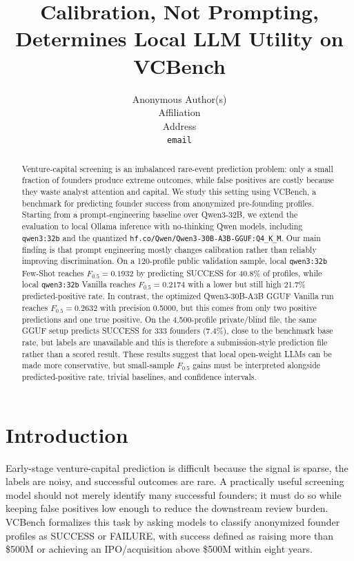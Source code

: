 \documentclass{article}
\title{Calibration, Not Prompting, Determines Local LLM Utility on VCBench}
\author{%
  Anonymous Author(s)\\
  Affiliation\\
  Address\\
  \texttt{email}\\
}
\begin{document}
\maketitle

\begin{abstract}
Venture-capital screening is an imbalanced rare-event prediction problem: only a
small fraction of founders produce extreme outcomes, while false positives are
costly because they waste analyst attention and capital. We study this setting
using VCBench, a benchmark for predicting founder success from anonymized
pre-founding profiles. Starting from a prompt-engineering baseline over
Qwen3-32B, we extend the evaluation to local Ollama inference with no-thinking
Qwen models, including \texttt{qwen3:32b} and the quantized
\texttt{hf.co/Qwen/Qwen3-30B-A3B-GGUF:Q4\_K\_M}. Our main finding is that prompt
engineering mostly changes calibration rather than reliably improving
discrimination. On a 120-profile public validation sample, local
\texttt{qwen3:32b} Few-Shot reaches $F_{0.5}=0.1932$ by predicting SUCCESS for
40.8\% of profiles, while local \texttt{qwen3:32b} Vanilla reaches
$F_{0.5}=0.2174$ with a lower but still high 21.7\% predicted-positive rate. In
contrast, the optimized Qwen3-30B-A3B GGUF Vanilla run reaches
$F_{0.5}=0.2632$ with precision 0.5000, but this comes from only two positive
predictions and one true positive. On the 4,500-profile private/blind file, the
same GGUF setup predicts SUCCESS for 333 founders (7.4\%), close to the
benchmark base rate, but labels are unavailable and this is therefore a
submission-style prediction file rather than a scored result. These results
suggest that local open-weight LLMs can be made more conservative, but
small-sample $F_{0.5}$ gains must be interpreted alongside predicted-positive
rate, trivial baselines, and confidence intervals.
\end{abstract}

\section{Introduction}

Early-stage venture-capital prediction is difficult because the signal is
sparse, the labels are noisy, and successful outcomes are rare. A practically
useful screening model should not merely identify many successful founders; it
must do so while keeping false positives low enough to reduce the downstream
review burden. VCBench formalizes this task by asking models to classify
anonymized founder profiles as SUCCESS or FAILURE, with success defined as
raising more than \$500M or achieving an IPO/acquisition above \$500M within
eight years.
\end{document}
